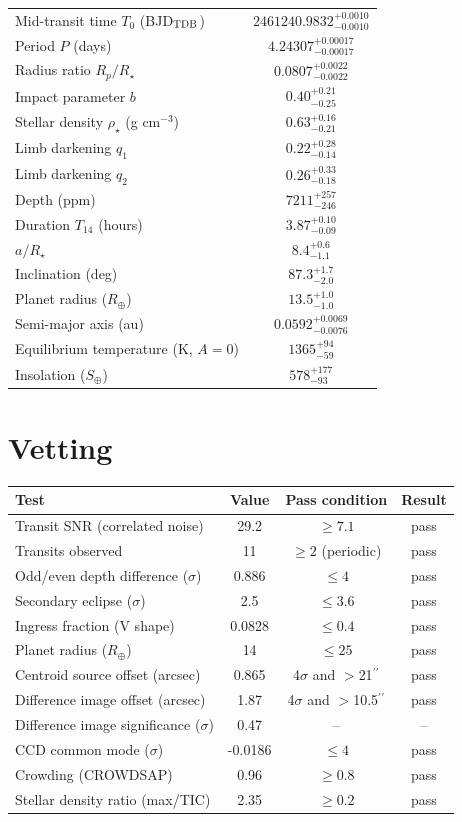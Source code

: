\documentclass[11pt,a4paper]{article}
\newcommand{\arcsec}{$^{\prime\prime}$}
\begin{document}
\begin{tabular}{lc}\toprule
Mid-transit time $T_0$ (BJD$_{\rm TDB}$) & $2461240.9832^{+0.0010}_{-0.0010}$ \\
Period $P$ (days) & $4.24307^{+0.00017}_{-0.00017}$ \\
Radius ratio $R_p/R_\star$ & $0.0807^{+0.0022}_{-0.0022}$ \\
Impact parameter $b$ & $0.40^{+0.21}_{-0.25}$ \\
Stellar density $\rho_\star$ (g cm$^{-3}$) & $0.63^{+0.16}_{-0.21}$ \\
Limb darkening $q_1$ & $0.22^{+0.28}_{-0.14}$ \\
Limb darkening $q_2$ & $0.26^{+0.33}_{-0.18}$ \\
Depth (ppm) & $7211^{+257}_{-246}$ \\
Duration $T_{14}$ (hours) & $3.87^{+0.10}_{-0.09}$ \\
$a/R_\star$ & $8.4^{+0.6}_{-1.1}$ \\
Inclination (deg) & $87.3^{+1.7}_{-2.0}$ \\
Planet radius ($R_\oplus$) & $13.5^{+1.0}_{-1.0}$ \\
Semi-major axis (au) & $0.0592^{+0.0069}_{-0.0076}$ \\
Equilibrium temperature (K, $A=0$) & $1365^{+94}_{-59}$ \\
Insolation ($S_\oplus$) & $578^{+177}_{-93}$ \\
\bottomrule\end{tabular}

\section*{Vetting}
\begin{tabular}{lccc}\toprule
Test & Value & Pass condition & Result \\\midrule
Transit SNR (correlated noise) & 29.2 & $\ge 7.1$ & pass \\
Transits observed & 11 & $\ge 2$ (periodic) & pass \\
Odd/even depth difference ($\sigma$) & 0.886 & $\le 4$ & pass \\
Secondary eclipse ($\sigma$) & 2.5 & $\le 3.6$ & pass \\
Ingress fraction (V shape) & 0.0828 & $\le 0.4$ & pass \\
Planet radius ($R_\oplus$) & 14 & $\le 25$ & pass \\
Centroid source offset (arcsec) & 0.865 & 4$\sigma$ and $>$21\arcsec & pass \\
Difference image offset (arcsec) & 1.87 & 4$\sigma$ and $>$10.5\arcsec & pass \\
Difference image significance ($\sigma$) & 0.47 & -- & -- \\
CCD common mode ($\sigma$) & -0.0186 & $\le 4$ & pass \\
Crowding (CROWDSAP) & 0.96 & $\ge 0.8$ & pass \\
Stellar density ratio (max/TIC) & 2.35 & $\ge 0.2$ & pass \\
\bottomrule\end{tabular}
\end{document}
